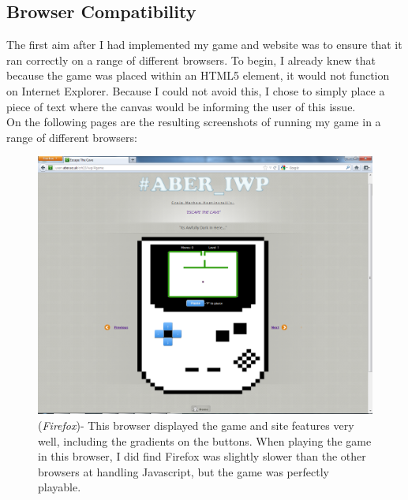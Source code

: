 \documentclass[a4paper]{article}
\begin{document}
\subsection{Browser Compatibility}
The first aim after I had implemented my game and website was to ensure that it
ran correctly on a range of different browsers. To begin, I already knew that
because the game was placed within an HTML5 element, it would not function on
Internet Explorer. Because I could not avoid this, I chose to simply place a
piece of text where the canvas would be informing the user of this issue.\\On
the following pages are the resulting screenshots of running my game in a range
of different browsers:
   \begin{figure}[!ht]
   \centering
   \includegraphics[scale=0.35]{firefox.png}
  \caption{(\emph{Firefox})- This browser displayed the game and site features
very well, including the gradients on the buttons. When playing the game in
this browser, I did find Firefox was slightly slower than the other browsers at
handling Javascript, but the game was perfectly playable.}
   \end{figure}
\clearpage
\end{document}
